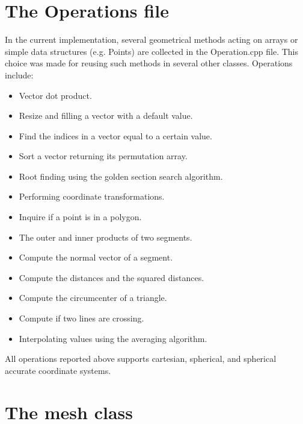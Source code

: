 \documentclass[biblatex]{deltares_manual}
\begin{document}
\chapter{The Operations file}

In the current implementation, several geometrical methods acting on arrays or simple data structures (e.g. Points) are collected in the Operation.cpp file. This choice was made for reusing such methods in several other classes. Operations include:
\begin{itemize}
\item Vector dot product.
\item Resize and filling a vector with a default value.
\item Find the indices in a vector equal to a certain value.
\item Sort a vector returning its permutation array.
\item Root finding using the golden section search algorithm.
\item Performing coordinate transformations.
\item Inquire if a point is in a polygon.
\item The outer and inner products of two segments.
\item Compute the normal vector of a segment.
\item Compute the distances and the squared distances.
\item Compute the circumcenter of a triangle.
\item Compute if two lines are crossing.
\item Interpolating values using the averaging algorithm.
\end{itemize}
All operations reported above supports cartesian, spherical, and spherical accurate coordinate systems.

\chapter{The mesh class}
\end{document}
